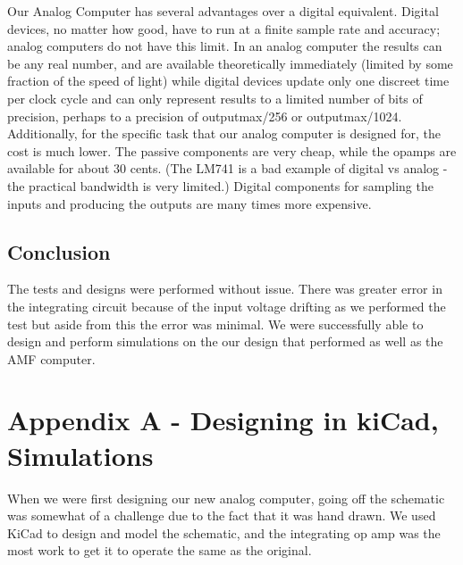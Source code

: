 \documentclass[11pt]{article}
\begin{document}
	Our Analog Computer has several advantages over a digital equivalent. Digital devices, no matter how good, have to run at a finite sample rate and accuracy; analog computers do not have this limit. In an analog computer the results can be any real number, and are available theoretically immediately (limited by some fraction of the speed of light) while digital devices update only one discreet time per clock cycle and can only represent results to a limited number of bits of precision, perhaps to a precision of outputmax/256 or outputmax/1024. Additionally, for the specific task that our analog computer is designed for, the cost is much lower. The passive components are very cheap, while the opamps are available for about 30 cents. (The LM741 is a bad example of digital vs analog - the practical bandwidth is very limited.) Digital components for sampling the inputs and producing the outputs are many times more expensive.
	\subsection *{Conclusion}
	The tests and designs were performed without issue. There was greater error in the integrating circuit because of the input voltage drifting as we performed the test but aside from this the error was minimal. We were successfully able to design and perform simulations on the our design that performed as well as the AMF computer.
	\\
	\newpage
	\section*{Appendix A - Designing in kiCad, Simulations}
	When we were first designing our new analog computer, going off the schematic was somewhat of a challenge due to the fact that it was hand drawn. We used KiCad to design and model the schematic, and the integrating op amp was the most work to get it to operate the same as the original.
	
	
	
\end{document}
